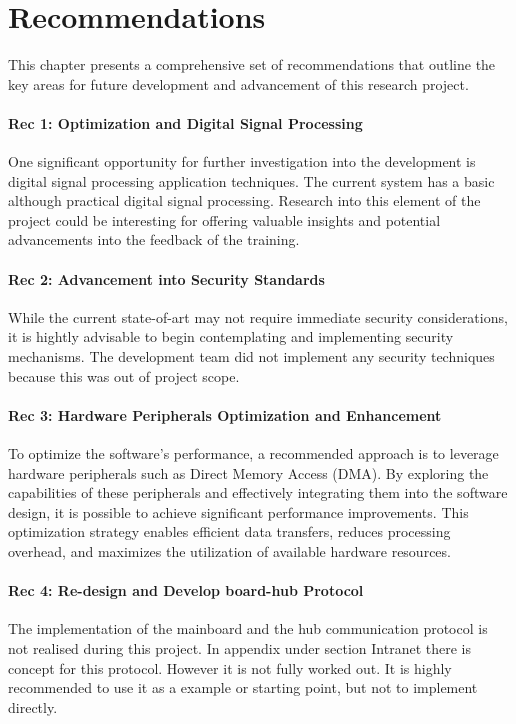 \chapter{Recommendations}
\label{chapter:rec}

This chapter presents a comprehensive set of recommendations that outline the key areas for future development and advancement of this research project.\\
\subsubsection*{Rec 1: Optimization and Digital Signal Processing}
One significant opportunity for further investigation into the development is digital signal processing application techniques. The current system has a basic although practical digital signal processing. Research into this element of the project could be interesting for offering valuable insights and potential advancements into the feedback of the training.
\subsubsection*{Rec 2: Advancement into Security Standards}
While the current state-of-art may not require immediate security considerations, it is hightly advisable to begin contemplating and implementing security mechanisms. The development team did not implement any security techniques because this was out of project scope.  
\subsubsection*{Rec 3: Hardware Peripherals Optimization and Enhancement}
To optimize the software's performance, a recommended approach is to leverage hardware peripherals such as Direct Memory Access (DMA). By exploring the capabilities of these peripherals and effectively integrating them into the software design, it is possible to achieve significant performance improvements. This optimization strategy enables efficient data transfers, reduces processing overhead, and maximizes the utilization of available hardware resources.
\subsubsection*{Rec 4: Re-design and Develop board-hub Protocol}
The implementation of the mainboard and the hub communication protocol is not realised during this project. In appendix under section Intranet there is concept for this protocol. However it is not fully worked out. It is highly recommended to use it as a example or starting point, but not to implement directly.